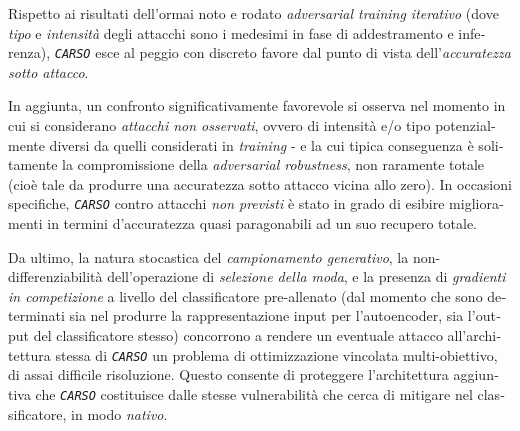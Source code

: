 \begin{otherlanguage}{italian}
Rispetto ai risultati dell'ormai noto e rodato \textit{adversarial training iterativo} (dove \textit{tipo} e \textit{intensità} degli attacchi sono i medesimi in fase di addestramento e inferenza), \textit{\texttt{CARSO}} esce al peggio con discreto favore dal punto di vista dell'\textit{accuratezza sotto attacco}.

In aggiunta, un confronto significativamente favorevole si osserva nel momento in cui si considerano \textit{attacchi non osservati}, ovvero di intensità e/o tipo potenzialmente diversi da quelli considerati in \textit{training} - e la cui tipica conseguenza è solitamente la compromissione della \textit{adversarial robustness}, non raramente totale (cioè tale da produrre una accuratezza sotto attacco vicina allo zero). In occasioni specifiche, \textit{\texttt{CARSO}} contro attacchi \textit{non previsti} è stato in grado di esibire miglioramenti in termini d'accuratezza quasi paragonabili ad un suo recupero totale.

Da ultimo, la natura stocastica del \textit{campionamento generativo}, la non-differenziabilità dell'operazione di \textit{selezione della moda}, e la presenza di \textit{gradienti in competizione} a livello del classificatore pre-allenato (dal momento che sono determinati sia nel produrre la rappresentazione input per l'autoencoder, sia l'output del classificatore stesso) concorrono a rendere un eventuale attacco all'architettura stessa di \textit{\texttt{CARSO}} un problema di ottimizzazione vincolata multi-obiettivo, di assai difficile risoluzione. Questo consente di proteggere l'architettura aggiuntiva che \textit{\texttt{CARSO}} costituisce dalle stesse vulnerabilità che cerca di mitigare nel classificatore, in modo \textit{nativo}.

\end{otherlanguage}